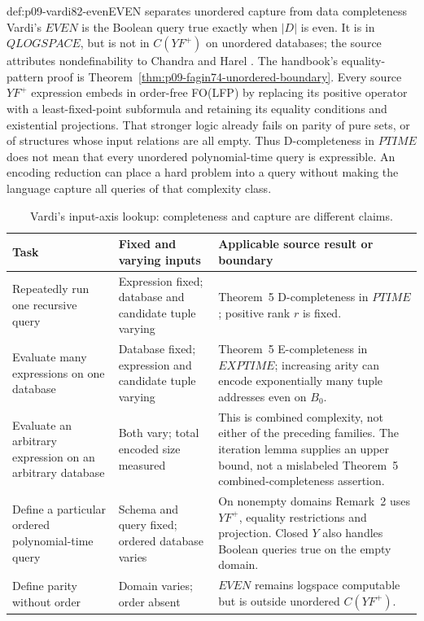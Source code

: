 \begin{hbexample}{def:p09-vardi82-even}{EVEN separates unordered capture from data completeness}
Vardi's \(EVEN\) is the Boolean query true exactly when \(\lvert D\rvert\)
is even.  It is in \(QLOGSPACE\), but is not in \(C(YF^+)\) on
unordered databases; the source attributes nondefinability to Chandra and
Harel \cite[Remark~2, p.~143]{Vardi1982}.
The handbook's equality-pattern proof is
Theorem~\ref{thm:p09-fagin74-unordered-boundary}.  Every source \(YF^+\)
expression embeds in order-free FO(LFP) by replacing its positive operator
with a least-fixed-point subformula and retaining its equality conditions and
existential projections.  That stronger logic already fails on parity of pure
sets, or of structures whose input relations are all empty.  Thus D-completeness
in \(PTIME\) does not mean that every unordered polynomial-time query is
expressible.  An encoding reduction can place a hard problem into a query
without making the language capture all queries of that complexity class.
\end{hbexample}

\begin{table}[htbp]
\centering\small
\begin{tabular}{@{}p{}p{}p{}@{}}
\toprule
Task & Fixed and varying inputs & Applicable source result or boundary \\
\midrule
Repeatedly run one recursive query & Expression fixed; database and candidate
tuple varying & Theorem~5 D-completeness in \(PTIME\); positive rank \(r\)
is fixed. \\
Evaluate many expressions on one database & Database fixed; expression and
candidate tuple varying & Theorem~5 E-completeness in \(EXPTIME\); increasing
arity can encode exponentially many tuple addresses even on \(B_0\). \\
Evaluate an arbitrary expression on an arbitrary database & Both vary; total
encoded size measured & This is combined complexity, not either of the preceding
families. The iteration lemma supplies an upper bound, not a mislabeled
Theorem~5 combined-completeness assertion. \\
Define a particular ordered polynomial-time query & Schema and query fixed;
ordered database varies & On nonempty domains Remark~2 uses \(YF^+\),
equality restrictions and projection. Closed \(Y\) also handles Boolean
queries true on the empty domain. \\
Define parity without order & Domain varies; order absent & \(EVEN\) remains
logspace computable but is outside unordered \(C(YF^+)\). \\
\bottomrule
\end{tabular}
\caption{Vardi's input-axis lookup: completeness and capture are different claims.}
\label{tab:p09-vardi82-input-axes}
\end{table}
